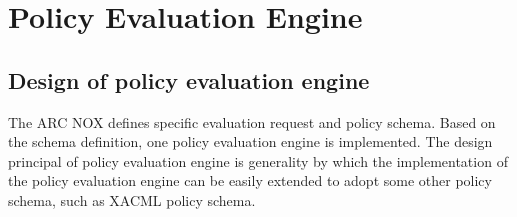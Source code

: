 \documentclass{article}                            %
\begin{document}



\section{Policy Evaluation Engine} %
\label{sec:policy_eval}

\subsection{Design of policy evaluation engine} %
\label{subsec:design_policyengine}

The ARC NOX defines specific evaluation request and policy schema. Based on the schema definition, one policy evaluation engine is implemented. The design principal of policy evaluation engine is generality by which the implementation of the policy evaluation engine can be easily extended to adopt some other policy schema, such as XACML policy schema.

\begin{figure}[ht]
\end{figure}
\end{document}

